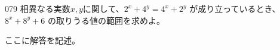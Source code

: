 \begin{prob}{079}{}{}
 相異なる実数$x, y$に関して、$2^x+4^y=4^x+2^y$ が成り立っているとき、$8^x+8^y+6$ の取りうる値の範囲を求めよ。
\end{prob}
ここに解答を記述。